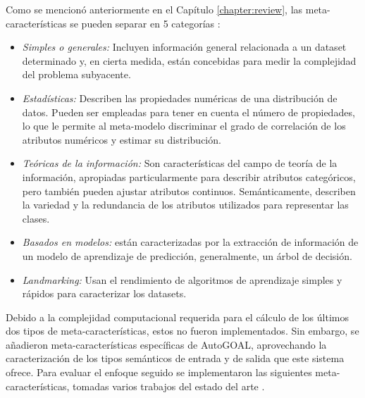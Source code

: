 
Como se mencionó anteriormente en el Capítulo \ref{chapter:review}, las meta-características se pueden separar en 5 categorías \cite{bradzil2009metalearning}:

\begin{itemize}
	\item \textit{Simples o generales:} Incluyen información general relacionada a un dataset determinado y, en cierta medida, están concebidas para medir la complejidad del problema subyacente.
	\item \textit{Estadísticas:} Describen las propiedades numéricas de una distribución de datos. Pueden ser empleadas para tener en cuenta el número de propiedades, lo que le permite al meta-modelo discriminar el grado de correlación de los atributos numéricos y estimar su distribución.
	\item \textit{Teóricas de la información:} Son características del campo de teoría de la información, apropiadas particularmente para describir atributos categóricos, pero también pueden ajustar atributos continuos. Semánticamente, describen la variedad y la redundancia de los atributos utilizados para representar las clases.
	\item \textit{Basados en modelos:} están caracterizadas por la extracción de información de un modelo de aprendizaje de predicción, generalmente, un árbol de decisión.
	\item \textit{Landmarking:} Usan el rendimiento de algoritmos de aprendizaje simples y rápidos para caracterizar los datasets.
\end{itemize}

Debido a la complejidad computacional requerida para el cálculo de los últimos dos tipos de meta-características, estos no fueron implementados. Sin embargo, se añadieron meta-características específicas de AutoGOAL, aprovechando la caracterización de los tipos semánticos de entrada y de salida que este sistema ofrece. Para evaluar el enfoque seguido se implementaron las siguientes meta-características, tomadas varios trabajos del estado del arte \cite{castiello2005metadata, fuerer2015efficient}.


